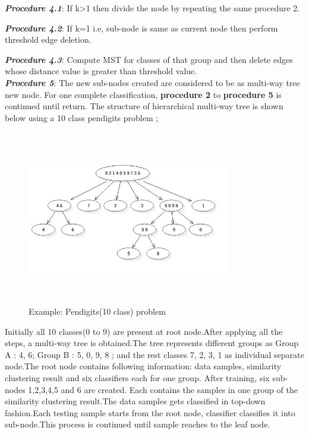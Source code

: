 \documentclass[a4paper, 10pt, conference]{ieeeconf}      %
\begin{document}
\par \textit{\textbf{Procedure 4.1}}: If k\textgreater1 then divide the node by repeating the same procedure 2.
\par \textit{\textbf{Procedure 4.2}}: If k=1 i.e, sub-node is same as current node then perform threshold edge deletion. 
\par \textit{\textbf{Procedure 4.3}}: Compute MST for classes of that group and then delete edges whose distance value is greater than threshold value.
\newline \\
\textit{\textbf{Procedure 5}}: The new sub-nodes created are considered to be as multi-way tree new node. For one complete classification, \textbf{procedure 2} to \textbf{procedure 5} is continued until return.
\newline
The structure of hierarchical multi-way tree is shown below using a 10 class pendigits problem ;
\begin{figure}[h!] 
\hspace{0.2cm}\includegraphics[scale=1,height=3in,width=3.5in]{pendigits_tree.jpg}
\caption{Example: Pendigits(10 class) problem}  
\end{figure}
\par
Initially all 10 classes(0 to 9) are present at root node.After applying all the steps, a multi-way tree is obtained.The tree represents different groups as Group A : 4, 6; Group B : 5, 0, 9, 8 ; and the rest classes 7, 2, 3, 1 as individual separate node.The root node contains following information: data samples, similarity clustering result and six classifiers each for one group. After training, six sub-nodes 1,2,3,4,5 and 6 are created. Each contains the samples in one group of the similarity clustering result.The data samples gets classified in top-down fashion.Each testing sample starts from the root node, classifier classifies it into sub-node.This process is continued until sample reaches to the leaf node.
\end{document}

